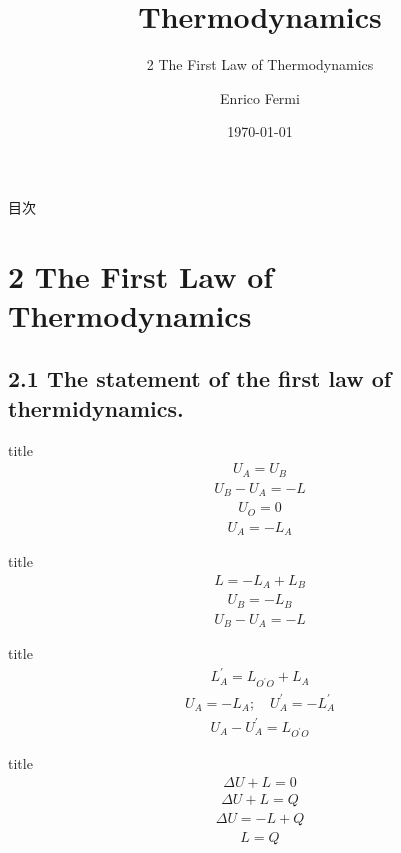 \documentclass[dvipdfmx, 10pt, aspectratio = 169]{beamer}
\title{Thermodynamics}
\subtitle{2 The First Law of Thermodynamics}
\date{\today}
\author{Enrico Fermi}
\begin{document}
\begin{frame}
	\titlepage
\end{frame}

\begin{frame}{目次}
\tableofcontents
\end{frame}

\section{2 The First Law of Thermodynamics}
\subsection{2.1 The statement of the first law of thermidynamics.}

\begin{frame}{title}
	\begin{align*}
		U_A = U_B
	\end{align*}
	\begin{align}
		U_B - U_A = -L
	\end{align}
	\begin{align}
		U_O = 0
	\end{align}
	\begin{align}
		U_A = - L_A
	\end{align}
\end{frame}

\begin{frame}{title}
	\begin{align*}
		L = -L_A + L_B
	\end{align*}
	\begin{align*}
		U_B = -L_B
	\end{align*}
	\begin{align*}
		U_B - U_A = -L
	\end{align*}
\end{frame}

\begin{frame}{title}
	\begin{align*}
		L_A^\prime = L_{O^\prime O} + L_A
	\end{align*}
	\begin{align*}
		U_A = -L_A; \quad U_A^\prime = -L_A^\prime
	\end{align*}
	\begin{align*}
		U_A - U_A^\prime = L_{O^\prime O}
	\end{align*}
\end{frame}

\begin{frame}{title}
	\begin{align}
		\Delta U + L = 0
	\end{align}
	\begin{align}
		\Delta U + L = Q
	\end{align}
	\begin{align*}
		\Delta U = -L + Q
	\end{align*}
	\begin{align}
		 L = Q
	\end{align}
\end{frame}
\end{document}
